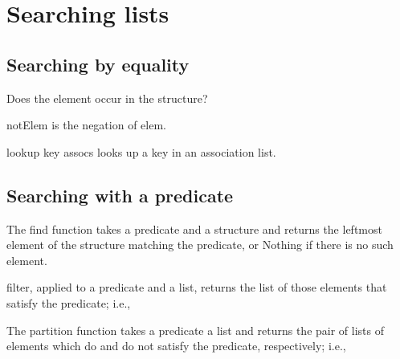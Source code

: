 \section{Searching lists}
\subsection{Searching by equality}

Does the element occur in the structure?

notElem is the negation of elem.

lookup key assocs looks up a key in an association list.

\subsection{Searching with a predicate}
The find function takes a predicate and a structure and returns the leftmost element of the structure matching the predicate, or Nothing if there is no such element.

filter, applied to a predicate and a list, returns the list of those elements that satisfy the predicate; i.e.,

The partition function takes a predicate a list and returns the pair of lists of elements which do and do not satisfy the predicate, respectively; i.e.,
